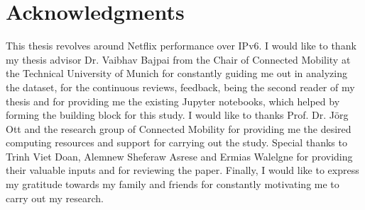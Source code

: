 \chapter{Acknowledgments}
\thispagestyle{empty}

\vspace*{20mm}

This thesis revolves around Netflix performance over IPv6. I would like to thank my thesis advisor Dr. Vaibhav Bajpai from the Chair of Connected Mobility at the Technical
University of Munich for constantly guiding me out in analyzing the dataset, for the continuous reviews, feedback, being the second reader of my thesis and for providing me the existing Jupyter notebooks, which helped by forming the building block for this study. I would
like to thanks Prof. Dr. Jörg Ott and the research group of Connected Mobility for providing me the desired computing resources and support for carrying out the study.
Special thanks to Trinh Viet Doan, Alemnew Sheferaw Asrese and Ermias Walelgne for providing their valuable inputs and for reviewing the paper.
Finally, I would like to express my gratitude towards my family and friends for constantly motivating me to carry out my research.

\vspace{10mm}
\cleardoublepage{}
